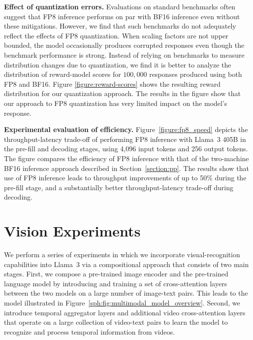 \textbf{Effect of quantization errors.} Evaluations on standard benchmarks often suggest that FP8 inference performs on par with BF16 inference even without these mitigations. However, we find that such benchmarks do not adequately reflect the effects of FP8 quantization. When scaling factors are not upper bounded, the model occasionally produces corrupted responses even though the benchmark performance is strong. Instead of relying on benchmarks to measure distribution changes due to quantization, we find it is better to analyze the distribution of reward-model scores for $100,000$ responses produced using both FP8 and BF16. Figure \ref{figure:reward-scores} shows the resulting reward distribution for our quantization approach. The results in the figure show that our approach to FP8 quantization has very limited impact on the model's response. 

\textbf{Experimental evaluation of efficiency.}
Figure~\ref{figure:fp8_speed} depicts the throughput-latency trade-off of performing FP8 inference with Llama~3 405B in the pre-fill and decoding stages, using 4,096 input tokens and 256 output tokens. The figure compares the efficiency of FP8 inference with that of the two-machine BF16 inference approach described in Section~\ref{section:pp}.
The results show that use of FP8 inference leads to throughput improvements of up to 50$\%$ during the pre-fill stage, and a substantially better throughput-latency trade-off during decoding.

\section{Vision Experiments}
\label{section:vision}

We perform a series of experiments in which we incorporate visual-recognition capabilities into Llama~3 via a compositional approach that consists of two main stages. First, we compose a pre-trained image encoder \citep{xu2023demystifying} and the pre-trained language model by introducing and training a set of cross-attention layers between the two models \citep{alayrac2022flamingo} on a large number of image-text pairs. This leads to the model illustrated in Figure~\ref{sph:fig:multimodal_model_overview}.
Second, we introduce temporal aggregator layers and additional video cross-attention layers that operate on a large collection of video-text pairs to learn the model to recognize and process temporal information from videos.


